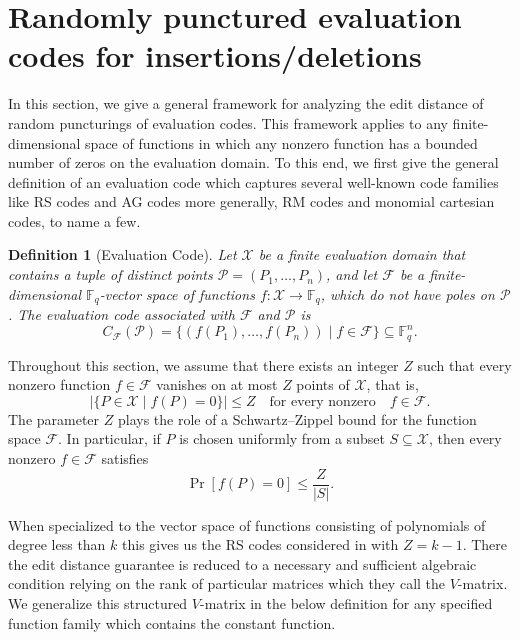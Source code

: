 \documentclass[draft, onecolumn, 11pt]{IEEEtran}
\newtheorem{definition}[theorem]{Definition}
\newcommand{\F}{\mathbb{F}}
\begin{document}
\section{Randomly punctured evaluation codes for insertions/deletions}

In this section, we give a general framework for analyzing the edit distance of random puncturings of evaluation codes. This framework applies to any finite-dimensional space of functions in which any nonzero function has a bounded number of zeros on the evaluation domain. To this end, we first give the general definition of an evaluation code which captures several well-known code families like RS codes and AG codes more generally, RM codes and monomial cartesian codes, to name a few.  

\begin{definition}[Evaluation Code]
    Let $\mathcal{X}$ be a finite evaluation domain that contains a tuple of distinct points $\mathcal{P} = (P_1, \dots, P_n)$, and let $\mathcal{F}$ be a finite-dimensional $\F_q$-vector space of functions
    $f : \mathcal{X} \to \F_q$, which do not have poles on $\mathcal{P}$. 
    The evaluation code associated with $\mathcal{F}$ and $\mathcal{P}$ is
    $$C_{\mathcal{F}}(\mathcal{P}) = \{ (f(P_1), \dots, f(P_n)) \mid f \in \mathcal{F} \} \subseteq \F_q^n.$$
\end{definition}
Throughout this section, we assume that there exists an integer $Z$ such that every nonzero function $f \in \mathcal{F}$ vanishes on at most $Z$ points of $\mathcal{X}$, that is,
$$\left|\lbrace P\in\mathcal{X} \mid f(P)=0\rbrace\right|\leq Z \quad \text{for every nonzero} \quad f \in \mathcal{F}.$$
The parameter $Z$ plays the role of a Schwartz--Zippel bound for the function space $\mathcal{F}$. In particular, if $P$ is chosen uniformly from a subset $S \subseteq \mathcal{X}$, then every nonzero $f \in \mathcal{F}$ satisfies
$$\Pr[f(P)=0]\leq \frac{Z}{|S|}.$$

When specialized to the vector space of functions consisting of polynomials of degree less than $k$ this gives us the RS codes considered in \cite{con2024randomRS} with $Z = k-1$. There the edit distance guarantee is reduced to a necessary and sufficient algebraic condition relying on the rank of particular matrices which they call the $V$-matrix. We generalize this structured $V$-matrix in the below definition for any specified function family which contains the constant function. 
\end{document}

